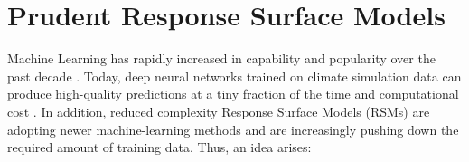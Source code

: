 \chapter{Prudent Response Surface Models} \label{txt:icarus-chapter}

Machine Learning has rapidly increased in capability and popularity over the past decade \cite{ml-trends-2021, ml-applications-2021}. Today, deep neural networks trained on climate simulation data can produce high-quality predictions at a tiny fraction of the time and computational cost \cite{neural-architecture-search-2021}. In addition, reduced complexity Response Surface Models (RSMs) are adopting newer machine-learning methods \cite{deep-rsm-2020} and are increasingly pushing down the required amount of training data. {\selectfont Thus, an idea arises:}

